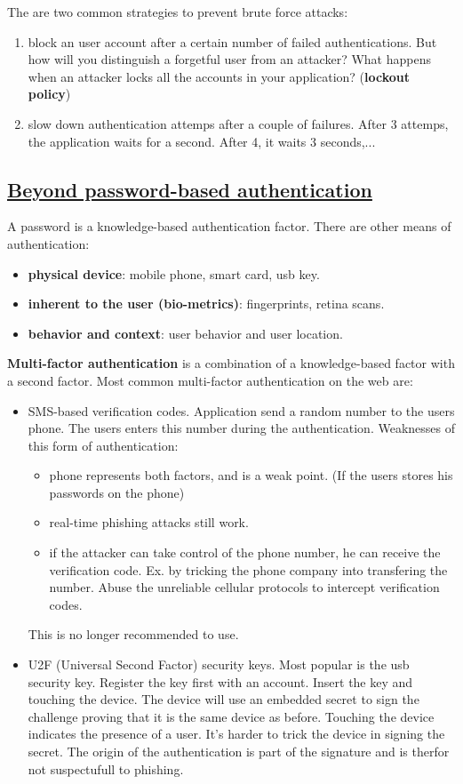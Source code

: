 \documentclass[titlepage]{article}
\begin{document}
    The are two common strategies to prevent brute force attacks:
    \begin{enumerate}
        \item block an user account after a certain number of failed authentications. But how will you distinguish a forgetful user from an attacker? What happens when an attacker locks all the accounts in your application? (\textbf{lockout policy})
        \item slow down authentication attemps after a couple of failures. After 3 attemps, the application waits for a second. After 4, it waits 3 seconds,...
    \end{enumerate}
    \subsection{\href{https://youtu.be/rsFBfnw-b1c}{Beyond password-based authentication}}
    A password is a knowledge-based authentication factor. There are other means of authentication:
    \begin{itemize}
        \item \textbf{physical device}: mobile phone, smart card, usb key.
        \item \textbf{inherent to the user (bio-metrics)}: fingerprints, retina scans.
        \item \textbf{behavior and context}: user behavior and user location.
    \end{itemize} 
    \textbf{Multi-factor authentication} is a combination of a knowledge-based factor with a second factor.
    Most common multi-factor authentication on the web are:
    \begin{itemize}
        \item SMS-based verification codes. Application send a random number to the users phone. The users enters this number during the authentication. Weaknesses of this form of authentication:
        \begin{itemize}
            \item phone represents both factors, and is a weak point. (If the users stores his passwords on the phone)
            \item real-time phishing attacks still work.
            \item if the attacker can take control of the phone number, he can receive the verification code. Ex. by tricking the phone company into transfering the number. Abuse the unreliable cellular protocols to intercept verification codes.
        \end{itemize}
        This is no longer recommended to use.
        \item U2F (Universal Second Factor) security keys. Most popular is the usb security key. Register the key first with an account. Insert the key and touching the device. The device will use an embedded secret to sign the challenge proving that it is the same device as before. Touching the device indicates the presence of a user. It's harder to trick the device in signing the secret. The origin of the authentication is part of the signature and is therfor not suspectufull to phishing.
    \end{itemize}
\end{document}
